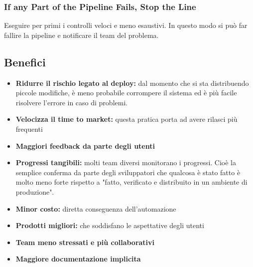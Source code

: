 \subsubsection{If any Part of the Pipeline Fails, Stop the Line}
Eseguire per primi i controlli veloci e meno esaustivi.
In questo modo si può far fallire la pipeline e notificare il team del problema.

\newpage
\subsection{Benefici}
\begin{itemize}
    \item \textbf{Ridurre il rischio legato al deploy:} dal momento che si sta distribuendo piccole modifiche, è meno probabile corrompere il sistema ed è più facile risolvere l’errore in caso di problemi.
    \item \textbf{Velocizza il time to market:} questa pratica porta ad avere rilasci più frequenti
    \item \textbf{Maggiori feedback da parte degli utenti}
    \item \textbf{Progressi tangibili:} molti team diversi monitorano i progressi. Cioè la semplice conferma da parte degli sviluppatori che qualcosa è stato fatto è molto meno forte rispetto a "fatto, verificato e distribuito in un ambiente di
    produzione".
    \item \textbf{Minor costo:} diretta conseguenza dell’automazione
    \item \textbf{Prodotti migliori:} che soddisfano le aspettative degli utenti
    \item \textbf{Team meno stressati e più collaborativi}
    \item \textbf{Maggiore documentazione implicita}
\end{itemize}

\newpage